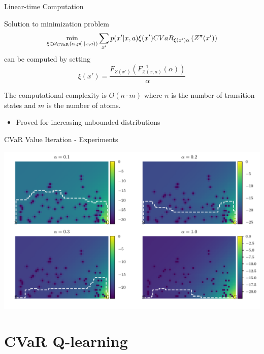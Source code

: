 \documentclass{beamer}
\begin{document}

\begin{frame}{Linear-time Computation}

\begin{theorem}
Solution to minimization problem 
$$\min_{\xi \in \mathcal{U}_{\text{CVaR}}(\alpha, p(\cdot | x, a))} \sum_{x'} p(x'| x, a)\xi(x') CVaR_{\xi(x')\alpha}\left( {Z^\pi(x')} \right)$$
can be computed by setting
$$\xi ( x' ) = \dfrac{F_{Z(x')}(F^{-1}_{Z(x,a)}(\alpha))}{\alpha} $$

The computational complexity is $O(n\cdot m)$ where $n$ is the number of transition states and $m$ is the number of atoms.
\end{theorem}

\begin{itemize}
\item Proved for increasing unbounded distributions
\end{itemize}

\end{frame}


\begin{frame}{CVaR Value Iteration - Experiments}

\center
\includegraphics[width=\linewidth]{../gfx/vi_optimal_paths.pdf}

\end{frame}

\section{CVaR Q-learning}
\end{document}
